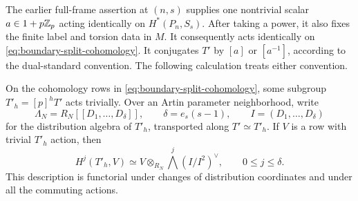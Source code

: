 The earlier full-frame assertion at $(n,s)$ supplies one nontrivial
scalar $a\in1+p\mathbb Z_p$ acting identically on $H^*(P_n,S_s)$.
After taking a power, it also fixes the finite label and torsion
data in $M$.  It consequently acts identically on
\eqref{eq:boundary-split-cohomology}.  It conjugates $T'$ by
$[a]$ or $[a^{-1}]$, according to the dual-standard convention.
The following calculation treats either convention.

\begin{lemma}
\label{boundary:translation-descent}
On the cohomology rows in \eqref{eq:boundary-split-cohomology}, some
subgroup $T'_h=[p]^hT'$ acts trivially.  Over an Artin parameter
neighborhood, write
\[
 \Lambda_N=R_N[[D_1,\ldots,D_\delta]],
 \qquad \delta=e_s(s-1),\qquad I=(D_1,\ldots,D_\delta)
\]
for the distribution algebra of $T'_h$, transported along
$T'\simeq T'_h$.  If $V$ is a row with trivial $T'_h$ action, then
\begin{equation}
 \label{eq:boundary-relative-koszul}
 H^j(T'_h,V)
   \simeq
 V\otimes_{R_N}\bigwedge^j(I/I^2)^\vee,
 \qquad 0\leq j\leq\delta.
\end{equation}
This description is functorial under changes of distribution
coordinates and under all the commuting actions.
\end{lemma}

